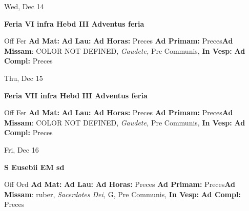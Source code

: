 \documentclass[10pt]{book}
\begin{document}
\begin{center}
\begin{minipage}{3.5in}
\vspace{2em}
\begin{center}Wed, Dec 14
\end{center}
\textbf{ \large Feria VI infra Hebd III Adventus
\textnormal{\normalsize feria}}

\begin{justify}Off Fer
\textbf{Ad Mat: }
\textbf{Ad Lau: }
\textbf{Ad Horas: }Preces
\textbf{Ad Primam: }Preces\textbf{Ad Missam}: COLOR NOT DEFINED, \textit{Gaudete,} Pre Communis, 
\textbf{In Vesp: }
\textbf{Ad Compl: }Preces
\end{justify}
\end{minipage}
\end{center}

\begin{center}
\begin{minipage}{3.5in}
\vspace{2em}
\begin{center}Thu, Dec 15
\end{center}
\textbf{ \large Feria VII infra Hebd III Adventus
\textnormal{\normalsize feria}}

\begin{justify}Off Fer
\textbf{Ad Mat: }
\textbf{Ad Lau: }
\textbf{Ad Horas: }Preces
\textbf{Ad Primam: }Preces\textbf{Ad Missam}: COLOR NOT DEFINED, \textit{Gaudete,} Pre Communis, 
\textbf{In Vesp: }
\textbf{Ad Compl: }Preces
\end{justify}
\end{minipage}
\end{center}

\begin{center}
\begin{minipage}{3.5in}
\vspace{2em}
\begin{center}Fri, Dec 16
\end{center}
\textbf{ \large S Eusebii EM
\textnormal{\normalsize sd}}

\begin{justify}Off Ord
\textbf{Ad Mat: }
\textbf{Ad Lau: }
\textbf{Ad Horas: }Preces
\textbf{Ad Primam: }Preces\textbf{Ad Missam}: ruber, \textit{Sacerdotes Dei,} G, Pre Communis, 
\textbf{In Vesp: }
\textbf{Ad Compl: }Preces
\end{justify}
\end{minipage}
\end{center}
\end{document}
